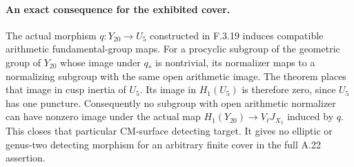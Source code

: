 \paragraph{An exact consequence for the exhibited cover.}
The actual morphism $q:Y_{20}\to U_5$ constructed in
F.3.19 induces compatible arithmetic fundamental-group
maps. For a procyclic subgroup of the geometric group of
$Y_{20}$ whose image under $q_*$ is nontrivial, its
normalizer maps to a normalizing subgroup with the same
open arithmetic image. The theorem places that image
in cusp inertia of $U_5$. Its image in $H_1(U_5)$ is
therefore zero, since $U_5$ has one puncture. Consequently
no subgroup with open arithmetic normalizer can have
nonzero image under the actual map
$H_1(Y_{20})\to V_\ell J_{X_5}$ induced by $q$.
This closes that particular CM-surface detecting target.
It gives no elliptic or genus-two detecting morphism for
an arbitrary finite cover in the full A.22 assertion.
